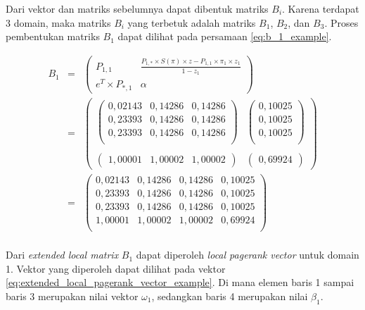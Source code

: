 Dari vektor dan matriks sebelumnya dapat dibentuk matriks $B_i$. Karena terdapat 3 domain, maka matriks $B_i$ yang terbetuk adalah matriks $B_1$, $B_2$, dan $B_3$. Proses pembentukan matriks $B_1$ dapat dilihat pada persamaan \ref{eq:b_1_example}.

\begin{align}
\label{eq:b_1_example}
	B_1 & = & 
	\begin{pmatrix}
		P_{1,1} & \frac{P_{1,\ast} \times S(\pi) \times z - P_{1,1} \times \pi_1 \times z_1}{1 - z_1} \\
		e^T \times P_{\ast,1} & \alpha
	\end{pmatrix} \nonumber \\
	& = &
	\begin{pmatrix}
		\begin{pmatrix}
			0,02143 & 0,14286 & 0,14286 \\
			0,23393 & 0,14286 & 0,14286 \\
			0,23393 & 0,14286 & 0,14286 \\
		\end{pmatrix} & 
		\begin{pmatrix}
			0,10025 \\ 
			0,10025 \\ 
			0,10025 \\
		\end{pmatrix} \\\\
		\begin{pmatrix}
			1,00001 & 1,00002 & 1,00002
		\end{pmatrix} & 
		\begin{pmatrix}
			0,69924
		\end{pmatrix}
	\end{pmatrix} \\ \nonumber
	& = &
	\begin{pmatrix}
		0,02143 & 0,14286 & 0,14286 & 0,10025 \\
		0,23393 & 0,14286 & 0,14286 & 0,10025 \\
		0,23393 & 0,14286 & 0,14286 & 0,10025 \\
		1,00001 & 1,00002 & 1,00002 & 0,69924 \\
	\end{pmatrix} \\ \nonumber
\end{align}

Dari \textit{extended local matrix} $B_1$ dapat diperoleh \textit{local pagerank vector} untuk domain 1. Vektor yang diperoleh dapat dilihat pada vektor \ref{eq:extended_local_pagerank_vector_example}. Di mana elemen baris 1 sampai baris 3 merupakan nilai vektor $\omega_1$, sedangkan baris 4 merupakan nilai $\beta_1$.


